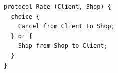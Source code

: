 \begin{lstlisting}[language={},basicstyle=\ttfamily\footnotesize,breaklines=true]
protocol Race (Client, Shop) {
  choice {
    Cancel from Client to Shop;
  } or {
    Ship from Shop to Client;
  }
}
\end{lstlisting}
